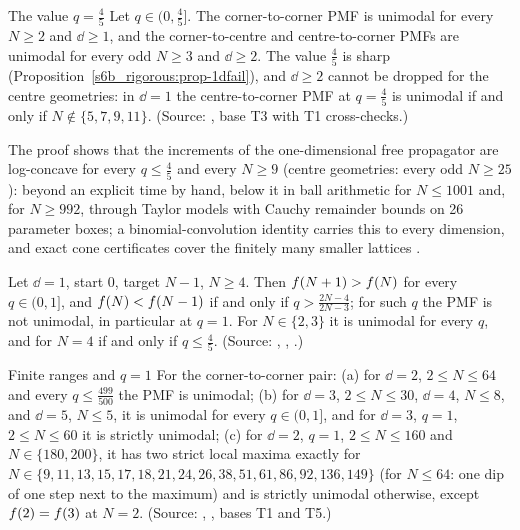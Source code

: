 \begin{catheorem}{The value $q=\frac45$}\label{s6b_rigorous:thm-45}
Let $q\in(0,\frac45]$. The corner-to-corner PMF is unimodal for every $N\ge2$ and $\dd\ge1$, and the corner-to-centre
and centre-to-corner PMFs are unimodal for every odd $N\ge3$ and $\dd\ge2$. The value $\frac45$ is sharp
(Proposition~\ref{s6b_rigorous:prop-1dfail}), and $\dd\ge2$ cannot be dropped for the centre geometries: in
$\dd=1$ the centre-to-corner PMF at $q=\frac45$ is unimodal if and only if $N\notin\{5,7,9,11\}$.
\textup{(Source: , base T3 with T1 cross-checks.)}
\end{catheorem}

The proof shows that the increments of the one-dimensional free propagator are log-concave for every $q\le\frac45$ and
every $N\ge9$ (centre geometries: every odd $N\ge25$): beyond an explicit time by hand, below it in ball arithmetic for
$N\le1001$ and, for $N\ge992$, through Taylor models with Cauchy remainder bounds on 26 parameter boxes; a
binomial-convolution identity carries this to every dimension, and exact cone certificates cover the finitely many
smaller lattices .

\begin{proposition}[Failure near $q=1$ on the chain]\label{s6b_rigorous:prop-1dfail}
Let $\dd=1$, start $0$, target $N-1$, $N\ge4$. Then $f(N+1)>f(N)$ for every $q\in(0,1]$, and $f(N)<f(N-1)$
if and only if $q>\frac{2N-4}{2N-3}$; for such $q$ the PMF is not unimodal, in particular at $q=1$. For $N\in\{2,3\}$
it is unimodal for every $q$, and for $N=4$ if and only if $q\le\frac45$.
\textup{(Source: , , .)}
\end{proposition}

\begin{catheorem}{Finite ranges and $q=1$}\label{s6b_rigorous:thm-finite}
For the corner-to-corner pair:
(a) for $\dd=2$, $2\le N\le64$ and every $q\le\frac{499}{500}$ the PMF is unimodal;
(b) for $\dd=3$, $2\le N\le30$, $\dd=4$, $N\le8$, and $\dd=5$, $N\le5$, it is unimodal for every $q\in(0,1]$, and for
$\dd=3$, $q=1$, $2\le N\le60$ it is strictly unimodal;
(c) for $\dd=2$, $q=1$, $2\le N\le160$ and $N\in\{180,200\}$, it has two strict local maxima exactly for
$N\in\{9,11,13,15,17,18,21,24,26,38,51,61,86,92,136,149\}$ (for $N\le64$: one dip of one step next to the
maximum) and is strictly unimodal otherwise, except $f(2)=f(3)$ at $N=2$.
\textup{(Source: , , bases T1 and T5.)}
\end{catheorem}

